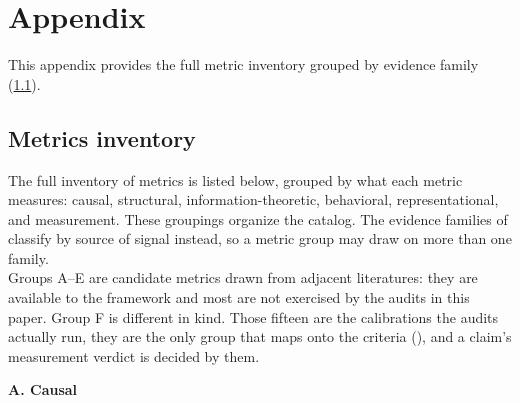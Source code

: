 \documentclass{article}
\begin{document}


\nocite{campbell1963experimental,loevinger1957objective}



\clearpage
\appendix
\section{Appendix}

This appendix provides the full metric inventory grouped by evidence family (\ref{appendix:metrics}).

\subsection{Metrics inventory}
\label{appendix:metrics}
The full inventory of metrics is listed below, grouped by what each metric measures: causal, structural, information-theoretic, behavioral, representational, and measurement. These groupings organize the catalog. The evidence families of  classify by source of signal instead, so a metric group may draw on more than one family. \\
Groups A--E are candidate metrics drawn from adjacent literatures: they are available to the framework and most are not exercised by the audits in this paper.  Group F is different in kind.  Those fifteen are the calibrations the audits actually run, they are the only group that maps onto the criteria (), and a claim's measurement verdict is decided by them.
\\
\begingroup
\small
\setlength{\tabcolsep}{4pt}
\renewcommand{\arraystretch}{1.15}


\begingroup
\small
\setlength{\tabcolsep}{4pt}
\renewcommand{\arraystretch}{1.15}
\noindent\textbf{A. Causal}\par
\vspace{4pt}\noindent{}
\nopagebreak
\end{document}
